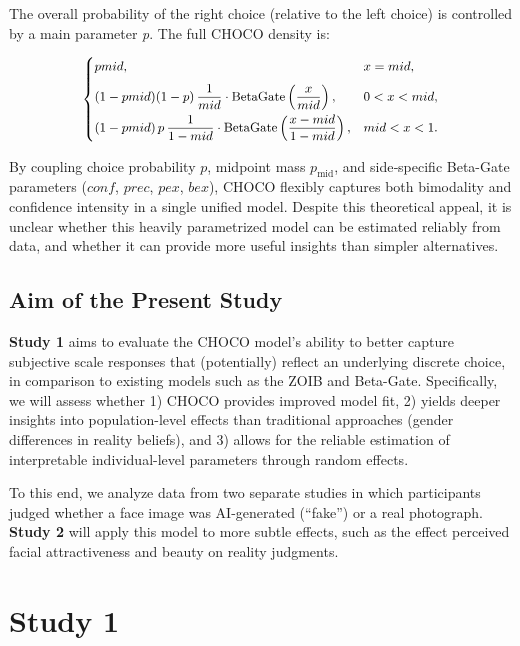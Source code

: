 \documentclass[
  jou,
  floatsintext,
  longtable,
  nolmodern,
  notxfonts,
  notimes,
  colorlinks=true,linkcolor=blue,citecolor=blue,urlcolor=blue]{apa7}
\begin{document}
The overall probability of the right choice (relative to the left
choice) is controlled by a main parameter \emph{p}. The full CHOCO
density is:

\[
\small
\begin{cases}
pmid, & x = mid, \\[6pt]
(1 - pmid)(1 - p)\,\dfrac{1}{mid} \cdot \mathrm{BetaGate}\left(\dfrac{x}{mid}\right), & 0 < x < mid, \\[6pt]
(1 - pmid)\,p\,\dfrac{1}{1 - mid} \cdot \mathrm{BetaGate}\left(\dfrac{x - mid}{1 - mid}\right), & mid < x < 1. \\
\end{cases}
\]

By coupling choice probability \(p\), midpoint mass \(p_{\text{mid}}\),
and side‐specific Beta-Gate parameters (\(conf\), \(prec\), \(pex\),
\(bex\)), CHOCO flexibly captures both bimodality and confidence
intensity in a single unified model. Despite this theoretical appeal, it
is unclear whether this heavily parametrized model can be estimated
reliably from data, and whether it can provide more useful insights than
simpler alternatives.

\subsection{Aim of the Present Study}\label{aim-of-the-present-study}

\textbf{Study 1} aims to evaluate the CHOCO model's ability to better
capture subjective scale responses that (potentially) reflect an
underlying discrete choice, in comparison to existing models such as the
ZOIB and Beta-Gate. Specifically, we will assess whether 1) CHOCO
provides improved model fit, 2) yields deeper insights into
population-level effects than traditional approaches (gender differences
in reality beliefs), and 3) allows for the reliable estimation of
interpretable individual-level parameters through random effects.

To this end, we analyze data from two separate studies in which
participants judged whether a face image was AI-generated (``fake'') or
a real photograph. \textbf{Study 2} will apply this model to more subtle
effects, such as the effect perceived facial attractiveness and beauty
on reality judgments.

\section{Study 1}\label{study-1}
\end{document}
